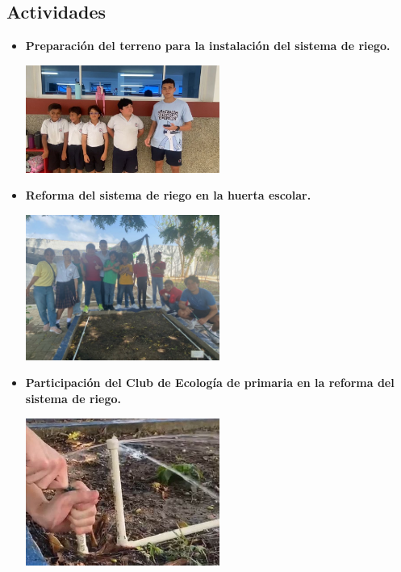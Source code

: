 \documentclass[12pt]{article}
\begin{document}
\subsection{Actividades}
\begin{itemize}
      \item \textbf{Preparación del terreno para la instalación del sistema de riego.}
            \begin{center}
                  \includegraphics[width=0.5\textwidth]{imagenes/actividad1.jpg}
            \end{center}

      \item \textbf{Reforma del sistema de riego en la huerta escolar.}
            \begin{center}
                  \includegraphics[width=0.5\textwidth]{imagenes/actividad2.jpg}
            \end{center}

      \item \textbf{Participación del Club de Ecología de primaria en la reforma del sistema de riego.}
            \begin{center}
                  \includegraphics[width=0.5\textwidth]{imagenes/sprinkler.jpg}
            \end{center}
\end{itemize}
\end{document}
